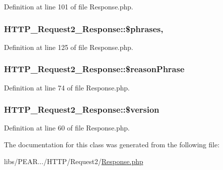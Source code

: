 Definition at line 101 of file Response.\+php.

\subsubsection[{\texorpdfstring{\$phrases}{$phrases}}]{\setlength{\rightskip}{0pt plus 5cm}H\+T\+T\+P\+\_\+\+Request2\+\_\+\+Response\+::\$phrases\hspace{0.3cm}{\ttfamily [static]}, {\ttfamily [protected]}}\hypertarget{classHTTP__Request2__Response_ad9a8fd735e8dc89eb7afc73750ec0bbc}{}\label{classHTTP__Request2__Response_ad9a8fd735e8dc89eb7afc73750ec0bbc}


Definition at line 125 of file Response.\+php.

\subsubsection[{\texorpdfstring{\$reason\+Phrase}{$reasonPhrase}}]{\setlength{\rightskip}{0pt plus 5cm}H\+T\+T\+P\+\_\+\+Request2\+\_\+\+Response\+::\$reason\+Phrase\hspace{0.3cm}{\ttfamily [protected]}}\hypertarget{classHTTP__Request2__Response_ab9faa50ba9b9f208a02a7c4ce75b391a}{}\label{classHTTP__Request2__Response_ab9faa50ba9b9f208a02a7c4ce75b391a}


Definition at line 74 of file Response.\+php.

\subsubsection[{\texorpdfstring{\$version}{$version}}]{\setlength{\rightskip}{0pt plus 5cm}H\+T\+T\+P\+\_\+\+Request2\+\_\+\+Response\+::\$version\hspace{0.3cm}{\ttfamily [protected]}}\hypertarget{classHTTP__Request2__Response_aadbcb4df3711846a3b890c5492c4ffe7}{}\label{classHTTP__Request2__Response_aadbcb4df3711846a3b890c5492c4ffe7}


Definition at line 60 of file Response.\+php.



The documentation for this class was generated from the following file\+:\begin{DoxyCompactItemize}
\item 
libs/\+P\+E\+A\+R.../\+H\+T\+T\+P/\+Request2/\hyperlink{Response_8php}{Response.\+php}\end{DoxyCompactItemize}
